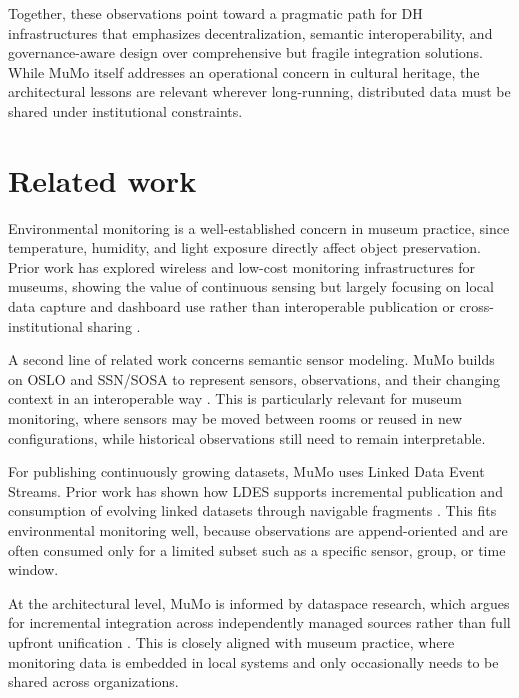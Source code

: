 Together, these observations point toward a pragmatic path for DH
infrastructures that emphasizes decentralization, semantic
interoperability, and governance-aware design over comprehensive but
fragile integration solutions. While MuMo itself addresses an
operational concern in cultural heritage, the architectural lessons are
relevant wherever long-running, distributed data must be shared under
institutional constraints.

\section{Related work}\label{sec:mumo-related}

Environmental monitoring is a well-established concern in museum
practice, since temperature, humidity, and light exposure directly
affect object preservation. Prior work has explored wireless and
low-cost monitoring infrastructures for museums, showing the value of
continuous sensing but largely focusing on local data capture and
dashboard use rather than interoperable publication or
cross-institutional sharing
\cite{laborda2022concept, rodriguez2010integrating}.

A second line of related work concerns semantic sensor modeling. MuMo
builds on OSLO and SSN/SOSA to represent sensors, observations, and
their changing context in an interoperable way
\cite{buyle2016oslo, compton2012ssn, ssn-sosa}. This is particularly
relevant for museum monitoring, where sensors may be moved between rooms
or reused in new configurations, while historical observations still
need to remain interpretable.

For publishing continuously growing datasets, MuMo uses Linked Data
Event Streams. Prior work has shown how LDES supports incremental
publication and consumption of evolving linked datasets through
navigable fragments \cite{vanlancker2021ldes, slabbinck2023linked}.
This fits environmental monitoring well, because observations are
append-oriented and are often consumed only for a limited subset such as
a specific sensor, group, or time window.

At the architectural level, MuMo is informed by dataspace research,
which argues for incremental integration across independently managed
sources rather than full upfront unification
\cite{franklin2005databases, halevy2006principles}. This is closely
aligned with museum practice, where monitoring data is embedded in local
systems and only occasionally needs to be shared across organizations.

